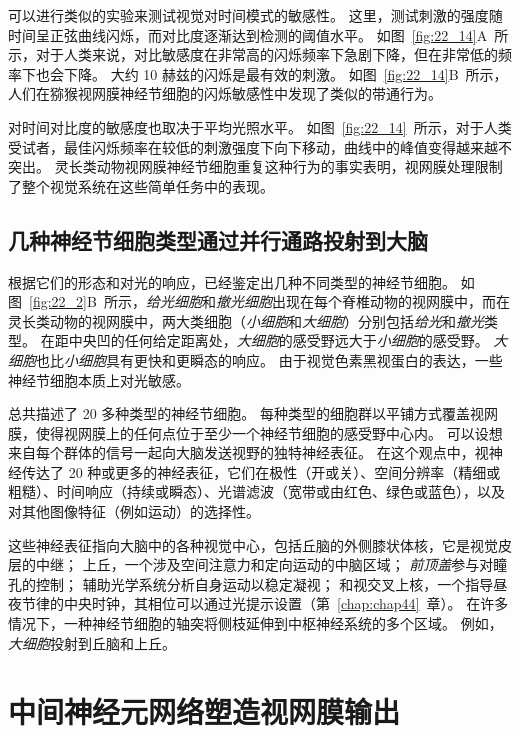 \begin{proposition}[人类感知的时空敏感性]
	\quad \quad 可以进行类似的实验来测试视觉对时间模式的敏感性。
	这里，测试刺激的强度随时间呈正弦曲线闪烁，而对比度逐渐达到检测的阈值水平。
	如图~\ref{fig:22_14}A~所示，对于人类来说，对比敏感度在非常高的闪烁频率下急剧下降，但在非常低的频率下也会下降。
	大约 10 赫兹的闪烁是最有效的刺激。
	如图~\ref{fig:22_14}B~所示，人们在猕猴视网膜神经节细胞的闪烁敏感性中发现了类似的带通行为。
	
	\quad \quad 对时间对比度的敏感度也取决于平均光照水平。
	如图~\ref{fig:22_14}~所示，对于人类受试者，最佳闪烁频率在较低的刺激强度下向下移动，曲线中的峰值变得越来越不突出。
	灵长类动物视网膜神经节细胞重复这种行为的事实表明，视网膜处理限制了整个视觉系统在这些简单任务中的表现。
	
\end{proposition}



\subsection{几种神经节细胞类型通过并行通路投射到大脑}

根据它们的形态和对光的响应，已经鉴定出几种不同类型的神经节细胞。
如图~\ref{fig:22_2}B~所示，\textit{给光细胞}和\textit{撤光细胞}出现在每个脊椎动物的视网膜中，而在灵长类动物的视网膜中，两大类细胞（\textit{小细胞}和\textit{大细胞}）分别包括\textit{给光}和\textit{撤光}类型。
在距中央凹的任何给定距离处，\textit{大细胞}的感受野远大于\textit{小细胞}的感受野。
\textit{大细胞}也比\textit{小细胞}具有更快和更瞬态的响应。
由于视觉色素黑视蛋白的表达，一些神经节细胞本质上对光敏感。


总共描述了 20 多种类型的神经节细胞。
每种类型的细胞群以平铺方式覆盖视网膜，使得视网膜上的任何点位于至少一个神经节细胞的感受野中心内。
可以设想来自每个群体的信号一起向大脑发送视野的独特神经表征。
在这个观点中，视神经传达了 20 种或更多的神经表征，它们在极性（开或关）、空间分辨率（精细或粗糙）、时间响应（持续或瞬态）、光谱滤波（宽带或由红色、绿色或蓝色），以及对其他图像特征（例如运动）的选择性。


这些神经表征指向大脑中的各种视觉中心，包括丘脑的外侧膝状体核，它是视觉皮层的中继；
上丘，一个涉及空间注意力和定向运动的中脑区域；
\textit{前顶盖}参与对瞳孔的控制；
辅助光学系统分析自身运动以稳定凝视；
和视交叉上核，一个指导昼夜节律的中央时钟，其相位可以通过光提示设置（第~\ref{chap:chap44}~章）。
在许多情况下，一种神经节细胞的轴突将侧枝延伸到中枢神经系统的多个区域。
例如，\textit{大细胞}投射到丘脑和上丘。



\section{中间神经元网络塑造视网膜输出}

